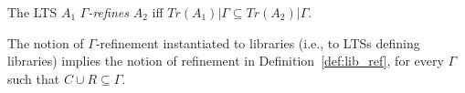 
\vspace{-1.5mm}
\begin{definition}\label{def:gref}
The LTS $A_1$ \emph{$\Gamma$-refines} $A_2$ if{f} $Tr(A_1) | \Gamma \subseteq Tr(A_2) | \Gamma$.
\vspace{-1.5mm}
\end{definition}

The notion of $\Gamma$-refinement instantiated to libraries (i.e., to LTSs defining libraries) implies the notion of refinement in Definition~\ref{def:lib_ref}, for every $\Gamma$ such that $C\cup R \subseteq \Gamma$.
%

